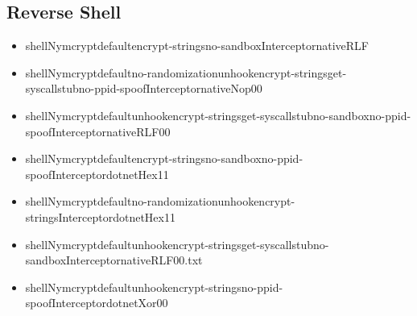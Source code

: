 \subsection{Reverse Shell}
\begin{itemize}
\item shellNymcryptdefaultencrypt-stringsno-sandboxInterceptornativeRLF
\item shellNymcryptdefaultno-randomizationunhookencrypt-stringsget-syscallstubno-ppid-spoofInterceptornativeNop00
\item shellNymcryptdefaultunhookencrypt-stringsget-syscallstubno-sandboxno-ppid-spoofInterceptornativeRLF00
\item shellNymcryptdefaultencrypt-stringsno-sandboxno-ppid-spoofInterceptordotnetHex11
\item shellNymcryptdefaultno-randomizationunhookencrypt-stringsInterceptordotnetHex11
\item shellNymcryptdefaultunhookencrypt-stringsget-syscallstubno-sandboxInterceptornativeRLF00.txt
\item shellNymcryptdefaultunhookencrypt-stringsno-ppid-spoofInterceptordotnetXor00
\end{itemize}
